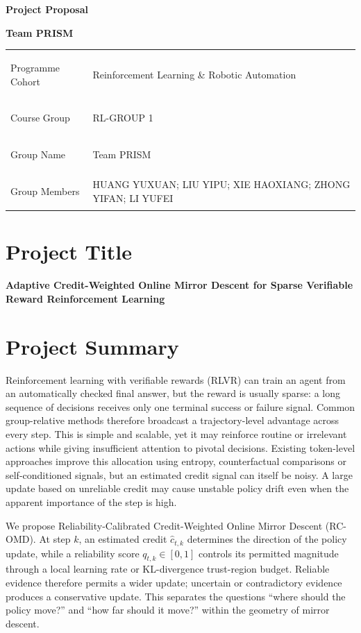 \documentclass[11pt,a4paper]{article}
\begin{document}
\begin{center}
  {\LARGE\bfseries Project Proposal}\par
  \vspace{3pt}
  {\large\color{prismblue}\bfseries Team PRISM}\par
\end{center}

\renewcommand{\arraystretch}{1.25}
\begin{tabularx}{\textwidth}{>{\bfseries\raggedright\arraybackslash}p{3.0cm}X}
\toprule
Programme Cohort & Reinforcement Learning \& Robotic Automation \\
Course Group & RL-GROUP 1 \\
Group Name & Team PRISM \\
Group Members & HUANG YUXUAN; LIU YIPU; XIE HAOXIANG; ZHONG YIFAN; LI YUFEI \\
\bottomrule
\end{tabularx}

\section*{Project Title}

\textbf{Adaptive Credit-Weighted Online Mirror Descent for Sparse Verifiable Reward Reinforcement Learning}

\section*{Project Summary}

Reinforcement learning with verifiable rewards (RLVR) can train an agent from an automatically checked final answer, but the reward is usually sparse: a long sequence of decisions receives only one terminal success or failure signal. Common group-relative methods therefore broadcast a trajectory-level advantage across every step. This is simple and scalable, yet it may reinforce routine or irrelevant actions while giving insufficient attention to pivotal decisions. Existing token-level approaches improve this allocation using entropy, counterfactual comparisons or self-conditioned signals, but an estimated credit signal can itself be noisy. A large update based on unreliable credit may cause unstable policy drift even when the apparent importance of the step is high.

We propose Reliability-Calibrated Credit-Weighted Online Mirror Descent (RC-OMD). At step $k$, an estimated credit $\widehat c_{t,k}$ determines the direction of the policy update, while a reliability score $q_{t,k}\in[0,1]$ controls its permitted magnitude through a local learning rate or KL-divergence trust-region budget. Reliable evidence therefore permits a wider update; uncertain or contradictory evidence produces a conservative update. This separates the questions ``where should the policy move?'' and ``how far should it move?'' within the geometry of mirror descent.
\end{document}
